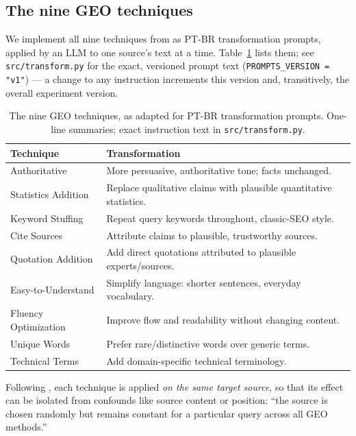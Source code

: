 \documentclass[11pt,a4paper]{article}
\begin{document}
\subsection{The nine GEO techniques}
\label{sec:techniques}

We implement all nine techniques from \citet{aggarwal2024geo} as PT-BR
transformation prompts, applied by an LLM to one source's text at a time.
Table~\ref{tab:techniques} lists them; see \texttt{src/transform.py} for the
exact, versioned prompt text (\texttt{PROMPTS\_VERSION = "v1"}) --- a change
to any instruction increments this version and, transitively, the overall
experiment version.

\begin{table}[htbp]
\centering
\small
\begin{tabular}{ll}
\toprule
\textbf{Technique} & \textbf{Transformation} \\
\midrule
Authoritative & More persuasive, authoritative tone; facts unchanged. \\
Statistics Addition & Replace qualitative claims with plausible quantitative statistics. \\
Keyword Stuffing & Repeat query keywords throughout, classic-SEO style. \\
Cite Sources & Attribute claims to plausible, trustworthy sources. \\
Quotation Addition & Add direct quotations attributed to plausible experts/sources. \\
Easy-to-Understand & Simplify language: shorter sentences, everyday vocabulary. \\
Fluency Optimization & Improve flow and readability without changing content. \\
Unique Words & Prefer rare/distinctive words over generic terms. \\
Technical Terms & Add domain-specific technical terminology. \\
\bottomrule
\end{tabular}
\caption{The nine GEO techniques, as adapted for PT-BR transformation
prompts. One-line summaries; exact instruction text in
\texttt{src/transform.py}.}
\label{tab:techniques}
\end{table}

Following \citet{aggarwal2024geo}, each technique is applied \emph{on the
same target source}, so that its effect can be isolated from confounds like
source content or position: ``the source is chosen randomly but remains
constant for a particular query across all GEO methods.''
\end{document}
